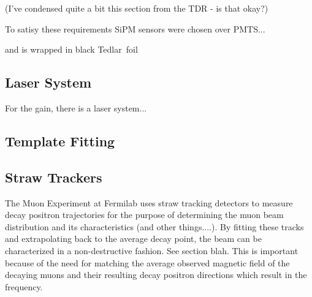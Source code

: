 (I've condensed quite a bit this section from the TDR - is that okay?)


To satisy these requirements SiPM sensors were chosen over PMTS...



and is wrapped in black Tedlar\textregistered\ foil



\cite{Kaspar:2016ofv} %



\subsection{Laser System}
\label{LaserSystem}

For the gain, there is a laser system...

\cite{Anastasi:2015ssy}
\cite{Anastasi:2016luh}
\cite{Anastasi:2017sos}










\subsection{Template Fitting}
\label{sec:TemplateFitting}





\subsection{Straw Trackers}
\label{sec:StrawTrackers}

The Muon \gmtwo Experiment at Fermilab uses straw tracking detectors to measure decay positron trajectories for the purpose of determining the muon beam distribution and its characteristics (and other things....). By fitting these tracks and extrapolating back to the average decay point, the beam can be characterized in a non-destructive fashion. See section blah. This is important because of the need for matching the average observed magnetic field of the decaying muons and their resulting decay positron directions which result in the \wa frequency.


